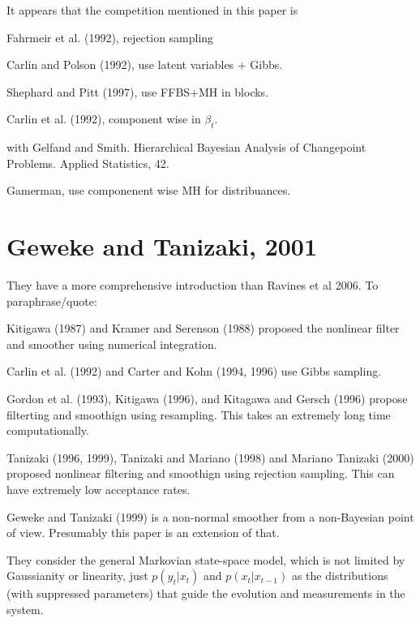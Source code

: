 \documentclass{article}
\begin{document}
\begin{outline}

\1 It appears that the competition mentioned in this paper is

  \2 Fahrmeir et al. (1992), rejection sampling

  \2 Carlin and Polson (1992), use latent variables + Gibbs.

  \2 Shephard and Pitt (1997), use FFBS+MH in blocks.

  \2 Carlin et al. (1992), component wise in $\beta_t$.

  with Gelfand and Smith.  Hierarchical Bayesian Analysis of Changepoint
  Problems.  Applied Statistics, 42.

  \2 Gamerman, use componenent wise MH for distribuances.  

\end{outline}

\section{Geweke and Tanizaki, 2001}

They have a more comprehensive introduction than Ravines et al 2006.  To
paraphrase/quote:
\begin{outline}

\1 Kitigawa (1987) and Kramer and Serenson (1988) proposed the nonlinear
  filter and smoother using numerical integration.

\1 Carlin et al. (1992) and Carter and Kohn (1994, 1996) use Gibbs sampling.

\1 Gordon et al. (1993), Kitigawa (1996), and Kitagawa and Gersch (1996) propose
filterting and smoothign using resampling.  This takes an extremely long time
computationally.

\1 Tanizaki (1996, 1999), Tanizaki and Mariano (1998) and Mariano Tanizaki
(2000) proposed nonlinear filtering and smoothign using rejection sampling.
This can have extremely low acceptance rates.

\1 Geweke and Tanizaki (1999) is a non-normal smoother from a non-Bayesian point
of view.  Presumably this paper is an extension of that.

\end{outline}

They consider the general Markovian state-space model, which is not limited by
Gaussianity or linearity, just $p(y_t | x_t)$ and $p(x_t | x_{t-1})$ as the
distributions (with suppressed parameters) that guide the evolution and
measurements in the system.
\end{document}
